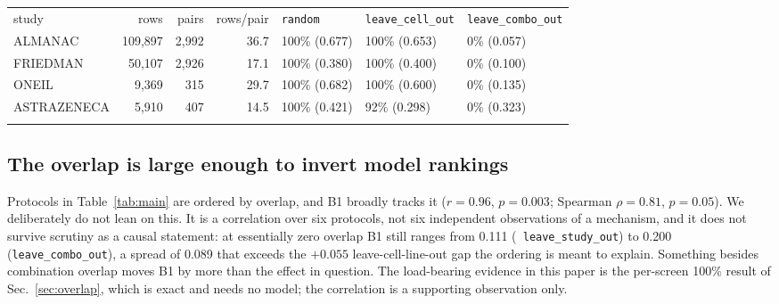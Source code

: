 \documentclass{ws-procs11x85}
\begin{document}
\begin{table}[ht]
{\begin{tabular}{@{}lrrrlll@{}} \toprule
study & rows & pairs & rows/pair & {\tt random} & {\tt leave\_cell\_out} & {\tt leave\_combo\_out} \\ \colrule
ALMANAC & 109,897 & 2,992 & 36.7 & 100\% (0.677) & 100\% (0.653) & 0\% (0.057) \\
FRIEDMAN & 50,107 & 2,926 & 17.1 & 100\% (0.380) & 100\% (0.400) & 0\% (0.100) \\
ONEIL & 9,369 & 315 & 29.7 & 100\% (0.682) & 100\% (0.600) & 0\% (0.135) \\
ASTRAZENECA & 5,910 & 407 & 14.5 & 100\% (0.421) & 92\% (0.298) & 0\% (0.323) \\ \botrule
\end{tabular}}
\label{tab:perstudy}
\end{table}

\subsection{The overlap is large enough to invert model rankings}\label{sec:invert}

Protocols in Table~\ref{tab:main} are ordered by overlap, and B1 broadly tracks
it ($r = 0.96$, $p = 0.003$; Spearman $\rho = 0.81$, $p = 0.05$). We deliberately
do not lean on this. It is a correlation over six protocols, not six independent
observations of a mechanism, and it does not survive scrutiny as a causal
statement: at essentially zero overlap B1 still ranges from 0.111 ({\tt
leave\_study\_out}) to 0.200 ({\tt leave\_combo\_out}), a spread of 0.089 that
exceeds the $+0.055$ leave-cell-line-out gap the ordering is meant to explain.
Something besides combination overlap moves B1 by more than the effect in
question. The load-bearing evidence in this paper is the per-screen 100\% result
of Sec.~\ref{sec:overlap}, which is exact and needs no model; the correlation is
a supporting observation only.
\end{document}
